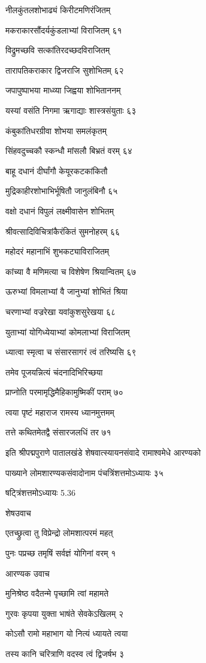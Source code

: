 नीलकुंतलशोभाढ्यं किरीटमणिरंजितम्

मकराकारसौंदर्यकुंडलाभ्यां विराजितम् ६१

विद्रुमच्छवि सत्कांतिरदच्छदविराजितम्

तारापतिकराकार द्विजराजि सुशोभितम् ६२

जपापुष्पाभया माध्व्या जिह्वया शोभिताननम्

यस्यां वसंति निगमा ऋगाद्याः शास्त्रसंयुताः ६३

कंबुकांतिधरग्रीवा शोभया समलंकृतम्

सिंहवदुच्चकौ स्कन्धौ मांसलौ बिभ्रतं वरम् ६४

बाहू दधानं दीर्घांगौ केयूरकटकांकितौ

मुद्रिकाहीरशोभाभिर्भूषितौ जानुलंबिनौ ६५

वक्षो दधानं विपुलं लक्ष्मीवासेन शोभितम्

श्रीवत्सादिविचित्रांकैरंकितं सुमनोहरम् ६६

महोदरं महानाभिं शुभकट्याविराजितम्

कांच्या वै मणिमत्या च विशेषेण श्रियान्वितम् ६७

ऊरुभ्यां विमलाभ्यां वै जानुभ्यां शोभितं श्रिया

चरणाभ्यां वज्ररेखा यवांकुशसुरेखया ६८

युताभ्यां योगिध्येयाभ्यां कोमलाभ्यां विराजितम्

ध्यात्वा स्मृत्वा च संसारसागरं त्वं तरिष्यसि ६९

तमेव पूजयन्नित्यं चंदनादिभिरिच्छया

प्राप्नोति परमामृद्धिमैहिकामुष्मिकीं पराम् ७०

त्वया पृष्टं महाराज रामस्य ध्यानमुत्तमम्

तत्ते कथितमेतद्वै संसारजलधिं तर ७१

इति श्रीपद्मपुराणे पातालखंडे शेषवात्स्यायनसंवादे रामाश्वमेधे आरण्यको

पाख्याने लोमशारण्यकसंवादोनाम पंचत्रिंशत्तमोऽध्यायः ३५

षट्त्रिंशत्तमोऽध्यायः 5.36

शेषउवाच

एतच्छ्रुत्वा तु विप्रेन्द्रो लोमशात्परमं महत्

पुनः पप्रच्छ तमृषिं सर्वज्ञं योगिनां वरम् १

आरण्यक उवाच

मुनिश्रेष्ठ वदैतन्मे पृच्छामि त्वां महामते

गुरवः कृपया युक्ता भाषंते सेवकेऽखिलम् २

कोऽसौ रामो महाभाग यो नित्यं ध्यायते त्वया

तस्य कानि चरित्राणि वदस्व त्वं द्विजर्षभ ३

